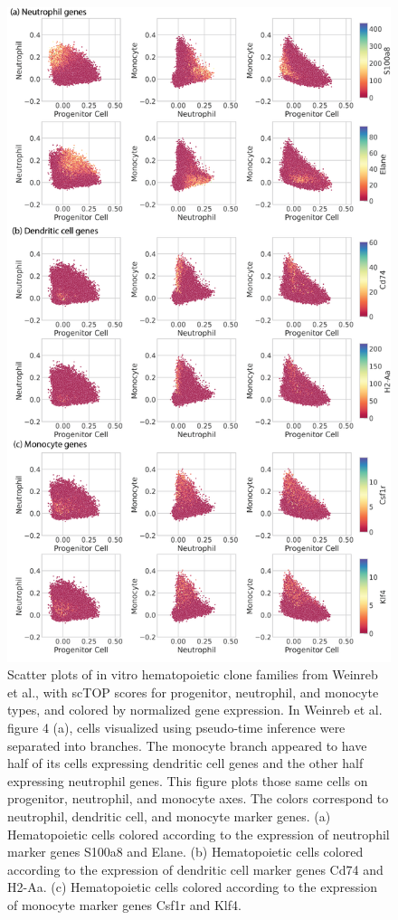 \documentclass[aps,superscriptaddress, notitlepage,longbibliography]{revtex4-1}
\begin{document}
\begin{figure}
	\centering
		\includegraphics[scale=0.72]{figs/hem genes.png}
	\caption{Scatter plots of in vitro hematopoietic clone families from Weinreb et al., with scTOP scores for progenitor, neutrophil, and monocyte types, and colored by normalized gene expression. In Weinreb et al. figure 4 (a), cells visualized using pseudo-time inference were separated into branches. The monocyte branch appeared to have half of its cells expressing dendritic cell genes and the other half expressing neutrophil genes. This figure plots those same cells on progenitor, neutrophil, and monocyte axes. The colors correspond to neutrophil, dendritic cell, and monocyte marker genes. (a) Hematopoietic cells colored according to the expression of neutrophil marker genes S100a8 and Elane. (b) Hematopoietic cells colored according to the expression of dendritic cell marker genes Cd74 and H2-Aa. (c) Hematopoietic cells colored according to the expression of monocyte marker genes Csf1r and Klf4. }
	\label{hem genes}
\end{figure}
\end{document}
